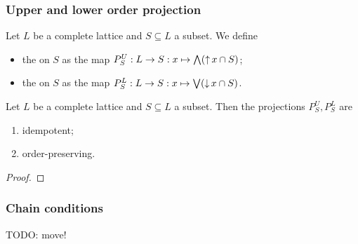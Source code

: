 \subsubsection{Upper and lower order projection}
\begin{definition}
Let $L$ be a complete lattice and $S\subseteq L$ a subset. We define
\begin{itemize}
\item the  on $S$ as the map $P_S^U: L\to S: x\mapsto \bigwedge (\operatorname{\uparrow} x\cap S)$;
\item the  on $S$ as the map $P_S^L: L\to S: x\mapsto \bigvee (\operatorname{\downarrow} x\cap S)$.
\end{itemize}
\end{definition}

\begin{lemma}
Let $L$ be a complete lattice and $S\subseteq L$ a subset. Then the projections $P_S^U, P_S^L$ are
\begin{enumerate}
\item idempotent;
\item order-preserving.
\end{enumerate}
\end{lemma}
\begin{proof}

\end{proof}

\subsubsection{Chain conditions}
TODO: move!

